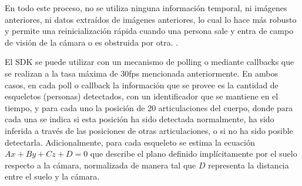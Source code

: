 En todo este proceso, no se utiliza ninguna información temporal, ni imágenes anteriores, ni datos extraídos de imágenes anteriores, lo cual lo hace más robusto y permite una reinicialización rápida cuando una persona sale y entra de campo de visión de la cámara o es obstruida por otra. \cite{Shotton2011}.  



El SDK se puede utilizar con un mecanismo de polling o mediante callbacks que se realizan a la tasa máxima de 30fps mencionada anteriormente. En ambos casos, en cada poll o callback la información que se provee es la cantidad de esqueletos (personas) detectados, con un identificador que se mantiene en el tiempo, y para cada uno la posición de 20 articulaciones del cuerpo, donde para cada una se indica si esta posición ha sido detectada normalmente, ha sido inferida a través de las posiciones de otras articulaciones, o si no ha sido posible detectarla. Adicionalmente, para cada esqueleto se estima la ecuación $Ax+By+Cz+D=0$ que describe el plano definido implícitamente por el suelo respecto a la cámara, normalizada de manera tal que $D$ representa la distancia entre el suelo y la cámara.
